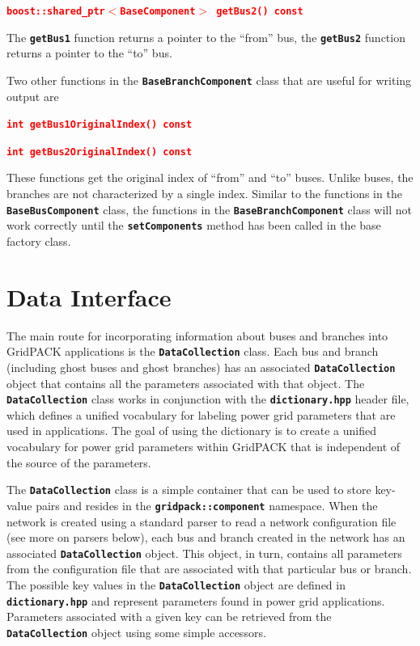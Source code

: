 \documentclass[12pt]{report} %
\begin{document}

\textcolor{red}{\texttt{\textbf{boost::shared\_ptr$\boldsymbol{\mathrm{<}}$BaseComponent$\boldsymbol{\mathrm{>}}$ getBus2() const}}}

The \texttt{\textbf{getBus1}} function returns a pointer to the ``from'' bus, the \texttt{\textbf{getBus2}} function returns a pointer to the ``to'' bus.

Two other functions in the \texttt{\textbf{BaseBranchComponent}} class that are useful for writing output are

\textcolor{red}{\texttt{\textbf{int getBus1OriginalIndex() const}}}


\textcolor{red}{\texttt{\textbf{int getBus2OriginalIndex() const}}}

These functions get the original index of ``from'' and ``to'' buses. Unlike buses, the branches are not characterized by a single index. Similar to the functions in the \texttt{\textbf{BaseBusComponent}} class, the functions in the \texttt{\textbf{BaseBranchComponent}} class will not work correctly until the \texttt{\textbf{setComponents}} method has been called in the base factory class.

\section{Data Interface}

The main route for incorporating information about buses and branches into GridPACK applications is the \texttt{\textbf{DataCollection}} class. Each bus and branch (including ghost buses and ghost branches) has an associated \texttt{\textbf{DataCollection}} object that contains all the parameters associated with that object. The \texttt{\textbf{DataCollection}} class works in conjunction with the \texttt{\textbf{dictionary.hpp}} header file, which defines a unified vocabulary for labeling power grid parameters that are used in applications. The goal of using the dictionary is to create a unified vocabulary for power grid parameters within GridPACK that is independent of the source of the parameters.

The \texttt{\textbf{DataCollection}} class is a simple container that can be used to store key-value pairs and resides in the \texttt{\textbf{gridpack::component}} namespace. When the network is created using a standard parser to read a network configuration file (see more on parsers below), each bus and branch created in the network has an associated \texttt{\textbf{DataCollection}} object. This object, in turn, contains all parameters from the configuration file that are associated with that particular bus or branch. The possible key values in the \texttt{\textbf{DataCollection}} object are defined in \texttt{\textbf{dictionary.hpp}} and represent parameters found in power grid applications. Parameters associated with a given key can be retrieved from the \texttt{\textbf{DataCollection}} object using some simple accessors.
\end{document}
